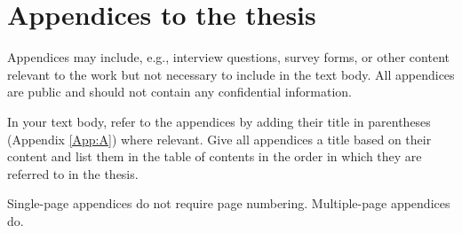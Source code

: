 \thispagestyle{empty} %
\section{Appendices to the thesis}\label{App:D}

Appendices may include, e.g., interview questions, survey forms, or other content relevant to the work but not necessary to include in the text body. All appendices are public and should not contain any confidential information.

In your text body, refer to the appendices by adding their title in parentheses (Appendix \ref{App:A}) where relevant. Give all appendices a title based on their content and list them in the table of contents in the order in which they are referred to in the thesis.

Single-page appendices do not require page numbering. Multiple-page appendices do.

\clearpage %